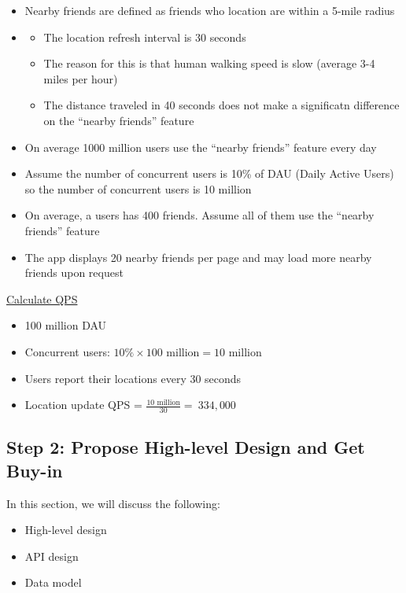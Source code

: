 \documentclass{report}
\theoremstyle{definition}
\let\oldsubsection\subsection
\renewcommand{\subsection}{\oldsubsection*}
\begin{document}
\begin{itemize}
\item
Nearby friends are defined as friends who location are within a 5-mile radius
\item

\begin{itemize}
\item
The location refresh interval is 30 seconds
\item
The reason for this is that human walking speed is slow (average 3-4 miles per hour)
\item
The distance traveled in 40 seconds does not make a significatn difference on the ``nearby friends'' feature
\end{itemize}
\item
On average 1000 million users use the ``nearby friends'' feature every day
\item
Assume the number of concurrent users is 10\% of DAU (Daily Active Users) so the number of concurrent users is 10 million
\item
On average, a users has 400 friends. Assume all of them use the ``nearby friends'' feature
\item
The app displays 20 nearby friends per page and may load more nearby friends upon request
\end{itemize}


\underline{Calculate QPS}

\begin{itemize}
\item
100 million DAU
\item
Concurrent users: $10\% \times 100 \text{ million} = 10 \text{ million }$
\item
Users report their locations every 30 seconds
\item
Location update QPS = $\frac{10 \text{ million}}{30} =~ 334,000$
\end{itemize}

\subsection{Step 2: Propose High-level Design and Get Buy-in}

In this section, we will discuss the following:

\begin{itemize}
\item
High-level design
\item
API design
\item
Data model
\end{itemize}
\end{document}
